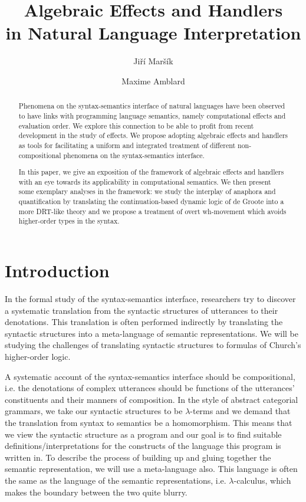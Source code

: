 \documentclass[a4paper,11pt]{easychair}
\title{Algebraic Effects and Handlers \\ in Natural Language Interpretation}
\author{Jiří Maršík \and Maxime Amblard}
\institute{LORIA, UMR 7503, Université de Lorraine, CNRS, Inria, Campus Scientifique, \\
F-54506 Vand\oe uvre-lès-Nancy, France \\
\email{\{jiri.marsik, maxime.amblard\}@loria.fr}}
\begin{document}
\maketitle

\begin{abstract}
  Phenomena on the syntax-semantics interface of natural languages have been
  observed to have links with programming language semantics, namely
  computational effects and evaluation order. We explore this connection to be
  able to profit from recent development in the study of effects. We propose
  adopting algebraic effects and handlers as tools for facilitating a uniform
  and integrated treatment of different non-compositional phenomena on the
  syntax-semantics interface. \par
  In this paper, we give an exposition of the framework of algebraic effects
  and handlers with an eye towards its applicability in computational
  semantics. We then present some exemplary analyses in the framework: we
  study the interplay of anaphora and quantification by translating the
  continuation-based dynamic logic of de Groote into a more DRT-like theory
  and we propose a treatment of overt wh-movement which avoids higher-order
  types in the syntax. \par
\end{abstract}

\section{Introduction}
\label{sec:motivation}

In the formal study of the syntax-semantics interface, researchers try to
discover a systematic translation from the syntactic structures of utterances
to their denotations. This translation is often performed indirectly by
translating the syntactic structures into a meta-language of semantic
representations. We will be studying the challenges of translating syntactic
structures to formulas of Church's higher-order logic.

A systematic account of the syntax-semantics interface should be
compositional, i.e. the denotations of complex utterances should be functions
of the utterances' constituents and their manners of composition. In the style
of abstract categorial grammars, we take our syntactic structures to be
$\lambda$-terms and we demand that the translation from syntax to semantics be
a homomorphism. This means that we view the syntactic structure as a program
and our goal is to find suitable definitions/interpretations for the
constructs of the language this program is written in. To describe the process
of building up and gluing together the semantic representation, we will use a
meta-language also. This language is often the same as the language of the
semantic representations, i.e. $\lambda$-calculus, which makes the boundary
between the two quite blurry.
\end{document}
